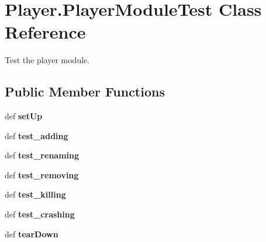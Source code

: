 \hypertarget{class_player_1_1_player_module_test}{
\section{Player.PlayerModuleTest Class Reference}
\label{class_player_1_1_player_module_test}
}


Test the player module.  


\subsection*{Public Member Functions}
\begin{DoxyCompactItemize}
\item 
\hypertarget{class_player_1_1_player_module_test_a707b60f05c7ef6ab143f8d0c874738b2}{
def {\bfseries setUp}}
\label{class_player_1_1_player_module_test_a707b60f05c7ef6ab143f8d0c874738b2}

\item 
\hypertarget{class_player_1_1_player_module_test_a1232bbbae69ad4b17f0c0bbc02e70a58}{
def {\bfseries test\_\-adding}}
\label{class_player_1_1_player_module_test_a1232bbbae69ad4b17f0c0bbc02e70a58}

\item 
\hypertarget{class_player_1_1_player_module_test_a8f1fb05da59b206cb4e2e2bdfed30d09}{
def {\bfseries test\_\-renaming}}
\label{class_player_1_1_player_module_test_a8f1fb05da59b206cb4e2e2bdfed30d09}

\item 
\hypertarget{class_player_1_1_player_module_test_a5b45002ef81b03f54053e7d08cf6c70b}{
def {\bfseries test\_\-removing}}
\label{class_player_1_1_player_module_test_a5b45002ef81b03f54053e7d08cf6c70b}

\item 
\hypertarget{class_player_1_1_player_module_test_af9efc9249e71dc4c2f24b876052c7101}{
def {\bfseries test\_\-killing}}
\label{class_player_1_1_player_module_test_af9efc9249e71dc4c2f24b876052c7101}

\item 
\hypertarget{class_player_1_1_player_module_test_ab7cc3069a98c5da8d3d9ba390a0e5bc9}{
def {\bfseries test\_\-crashing}}
\label{class_player_1_1_player_module_test_ab7cc3069a98c5da8d3d9ba390a0e5bc9}

\item 
\hypertarget{class_player_1_1_player_module_test_a26e105d1dcf13c37fc1ba3a2a0cb0126}{
def {\bfseries tearDown}}
\label{class_player_1_1_player_module_test_a26e105d1dcf13c37fc1ba3a2a0cb0126}

\end{DoxyCompactItemize}
